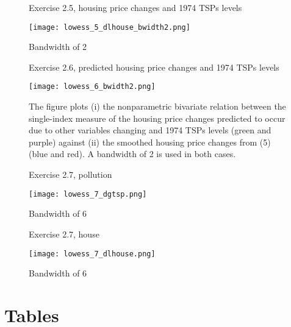 \documentclass[12pt]{article}
\begin{document}
\begin{figure}[h!]
\centering
\caption{Exercise 2.5, housing price changes and 1974 TSPs levels}
\texttt{[image: lowess\_5\_dlhouse\_bwidth2.png]}
\caption*{Bandwidth of 2}
\label{fig_lowess5_house}
\end{figure}

\clearpage

\begin{figure}[h!]
\centering
\caption{Exercise 2.6, predicted housing price changes and 1974 TSPs levels}
\texttt{[image: lowess\_6\_bwidth2.png]}
\caption*{The figure plots (i) the nonparametric bivariate relation between the single-index measure of the housing price changes predicted to occur due to other variables changing and 1974 TSPs levels (green and purple) against (ii) the smoothed housing price changes from (5) (blue and red). A bandwidth of 2 is used in both cases.}
\label{fig_lowess6}
\end{figure}

\clearpage

\begin{figure}[h!]
\centering
\caption{Exercise 2.7, pollution}
\texttt{[image: lowess\_7\_dgtsp.png]}
\caption*{Bandwidth of 6}
\label{lowess_7_dgtsp}
\end{figure}

\begin{figure}[h!]
\centering
\caption{Exercise 2.7, house}
\texttt{[image: lowess\_7\_dlhouse.png]}
\caption*{Bandwidth of 6}
\label{lowess_7_dlhouse}
\end{figure}


\clearpage

\section*{Tables}



\clearpage



\clearpage



\clearpage



\clearpage



\clearpage


\end{document}
